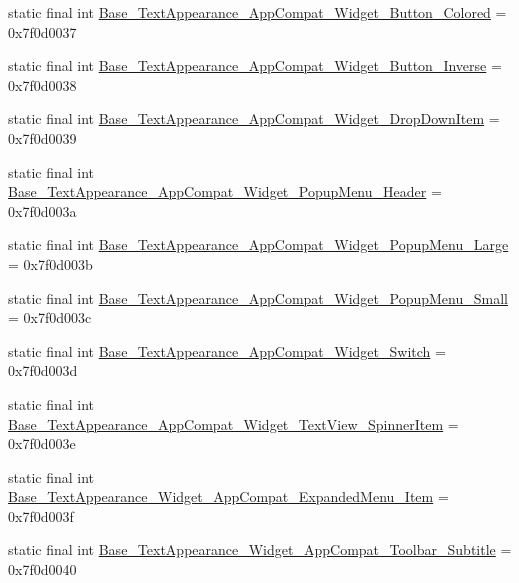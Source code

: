 \begin{DoxyCompactItemize}
\item 
static final int \mbox{\hyperlink{classandroid_1_1support_1_1v7_1_1appcompat_1_1R_1_1style_a9fa3c71c367abfcedbbb7ac29884c82b}{Base\+\_\+\+Text\+Appearance\+\_\+\+App\+Compat\+\_\+\+Widget\+\_\+\+Button\+\_\+\+Colored}} = 0x7f0d0037
\item 
static final int \mbox{\hyperlink{classandroid_1_1support_1_1v7_1_1appcompat_1_1R_1_1style_a75ec267d85c6e46c57ff7717ceafad6a}{Base\+\_\+\+Text\+Appearance\+\_\+\+App\+Compat\+\_\+\+Widget\+\_\+\+Button\+\_\+\+Inverse}} = 0x7f0d0038
\item 
static final int \mbox{\hyperlink{classandroid_1_1support_1_1v7_1_1appcompat_1_1R_1_1style_a4d7e47ebc08a4b842b8fabdf576f3e3d}{Base\+\_\+\+Text\+Appearance\+\_\+\+App\+Compat\+\_\+\+Widget\+\_\+\+Drop\+Down\+Item}} = 0x7f0d0039
\item 
static final int \mbox{\hyperlink{classandroid_1_1support_1_1v7_1_1appcompat_1_1R_1_1style_abc764e973c2ad2b2f6431c1aba4cc2b3}{Base\+\_\+\+Text\+Appearance\+\_\+\+App\+Compat\+\_\+\+Widget\+\_\+\+Popup\+Menu\+\_\+\+Header}} = 0x7f0d003a
\item 
static final int \mbox{\hyperlink{classandroid_1_1support_1_1v7_1_1appcompat_1_1R_1_1style_acec204e57bed4bc07073071d0a8a42dd}{Base\+\_\+\+Text\+Appearance\+\_\+\+App\+Compat\+\_\+\+Widget\+\_\+\+Popup\+Menu\+\_\+\+Large}} = 0x7f0d003b
\item 
static final int \mbox{\hyperlink{classandroid_1_1support_1_1v7_1_1appcompat_1_1R_1_1style_ad6af5d6b56317b8ec58f539b1888a924}{Base\+\_\+\+Text\+Appearance\+\_\+\+App\+Compat\+\_\+\+Widget\+\_\+\+Popup\+Menu\+\_\+\+Small}} = 0x7f0d003c
\item 
static final int \mbox{\hyperlink{classandroid_1_1support_1_1v7_1_1appcompat_1_1R_1_1style_a51725e1cbcc9c36e3ad88184aea4b38a}{Base\+\_\+\+Text\+Appearance\+\_\+\+App\+Compat\+\_\+\+Widget\+\_\+\+Switch}} = 0x7f0d003d
\item 
static final int \mbox{\hyperlink{classandroid_1_1support_1_1v7_1_1appcompat_1_1R_1_1style_ab9e96eae581adf2eb8614bbda6ac7394}{Base\+\_\+\+Text\+Appearance\+\_\+\+App\+Compat\+\_\+\+Widget\+\_\+\+Text\+View\+\_\+\+Spinner\+Item}} = 0x7f0d003e
\item 
static final int \mbox{\hyperlink{classandroid_1_1support_1_1v7_1_1appcompat_1_1R_1_1style_ae7658a7cd5c3425ebc9aa6bbb54a6a45}{Base\+\_\+\+Text\+Appearance\+\_\+\+Widget\+\_\+\+App\+Compat\+\_\+\+Expanded\+Menu\+\_\+\+Item}} = 0x7f0d003f
\item 
static final int \mbox{\hyperlink{classandroid_1_1support_1_1v7_1_1appcompat_1_1R_1_1style_ac64a505ec7328631cc1a2fe22d9c778a}{Base\+\_\+\+Text\+Appearance\+\_\+\+Widget\+\_\+\+App\+Compat\+\_\+\+Toolbar\+\_\+\+Subtitle}} = 0x7f0d0040

\end{DoxyCompactItemize}
